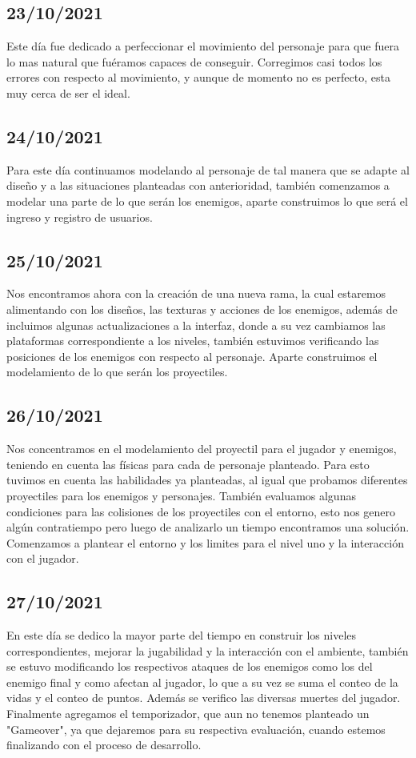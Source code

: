 \documentclass{article}
\begin{document}
    \subsection{23/10/2021}
    Este día fue dedicado a perfeccionar el movimiento del personaje para que fuera lo mas natural que fuéramos capaces de conseguir. Corregimos casi todos los errores con respecto al movimiento, y aunque de momento no es perfecto, esta muy cerca de ser el ideal.
    
    \subsection{24/10/2021}
    Para este día continuamos modelando al personaje de tal manera que se adapte al diseño y a las situaciones planteadas con anterioridad, también comenzamos a modelar una parte de lo que serán los enemigos, aparte construimos lo que será el ingreso y registro de usuarios.  
    
    \subsection{25/10/2021}
    Nos encontramos ahora con la creación de una nueva rama, la cual estaremos alimentando con los diseños, las texturas y acciones de los enemigos, además de incluimos algunas actualizaciones a la interfaz, donde a su vez cambiamos las plataformas correspondiente a los niveles, también estuvimos verificando las posiciones de los enemigos con respecto al personaje. Aparte construimos el modelamiento de lo que serán los  proyectiles. 
    
    \subsection{26/10/2021}
    Nos concentramos en el modelamiento del proyectil para el jugador  y enemigos, teniendo en cuenta las físicas para cada de personaje planteado. Para esto tuvimos en cuenta las habilidades ya planteadas, al igual que probamos diferentes proyectiles para los enemigos y personajes. También evaluamos algunas condiciones para las colisiones de los proyectiles con el entorno, esto nos genero algún contratiempo pero luego de analizarlo un tiempo encontramos una solución. Comenzamos a plantear el entorno y los limites para el nivel uno y la interacción con el jugador. 
    
\newpage
    
    \subsection{27/10/2021}
    En este día se dedico la mayor parte del tiempo en construir los niveles correspondientes, mejorar la jugabilidad y la interacción con el ambiente, también se estuvo modificando los respectivos ataques de los enemigos como los del enemigo final \cite{video_circular} y como afectan al jugador, lo que a su vez se suma el conteo de la vidas y el conteo de puntos. Además se verifico las diversas muertes del jugador. Finalmente agregamos el temporizador, que aun no tenemos planteado un "Gameover", ya que dejaremos para su respectiva evaluación, cuando estemos finalizando con el proceso de desarrollo.
    
\end{document}
